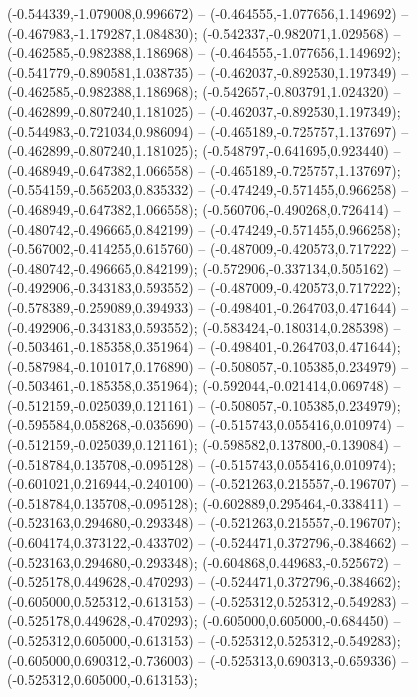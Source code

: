  (-0.544339,-1.079008,0.996672) -- (-0.464555,-1.077656,1.149692) -- (-0.467983,-1.179287,1.084830);
 (-0.542337,-0.982071,1.029568) -- (-0.462585,-0.982388,1.186968) -- (-0.464555,-1.077656,1.149692);
 (-0.541779,-0.890581,1.038735) -- (-0.462037,-0.892530,1.197349) -- (-0.462585,-0.982388,1.186968);
 (-0.542657,-0.803791,1.024320) -- (-0.462899,-0.807240,1.181025) -- (-0.462037,-0.892530,1.197349);
 (-0.544983,-0.721034,0.986094) -- (-0.465189,-0.725757,1.137697) -- (-0.462899,-0.807240,1.181025);
 (-0.548797,-0.641695,0.923440) -- (-0.468949,-0.647382,1.066558) -- (-0.465189,-0.725757,1.137697);
 (-0.554159,-0.565203,0.835332) -- (-0.474249,-0.571455,0.966258) -- (-0.468949,-0.647382,1.066558);
 (-0.560706,-0.490268,0.726414) -- (-0.480742,-0.496665,0.842199) -- (-0.474249,-0.571455,0.966258);
 (-0.567002,-0.414255,0.615760) -- (-0.487009,-0.420573,0.717222) -- (-0.480742,-0.496665,0.842199);
 (-0.572906,-0.337134,0.505162) -- (-0.492906,-0.343183,0.593552) -- (-0.487009,-0.420573,0.717222);
 (-0.578389,-0.259089,0.394933) -- (-0.498401,-0.264703,0.471644) -- (-0.492906,-0.343183,0.593552);
 (-0.583424,-0.180314,0.285398) -- (-0.503461,-0.185358,0.351964) -- (-0.498401,-0.264703,0.471644);
 (-0.587984,-0.101017,0.176890) -- (-0.508057,-0.105385,0.234979) -- (-0.503461,-0.185358,0.351964);
 (-0.592044,-0.021414,0.069748) -- (-0.512159,-0.025039,0.121161) -- (-0.508057,-0.105385,0.234979);
 (-0.595584,0.058268,-0.035690) -- (-0.515743,0.055416,0.010974) -- (-0.512159,-0.025039,0.121161);
 (-0.598582,0.137800,-0.139084) -- (-0.518784,0.135708,-0.095128) -- (-0.515743,0.055416,0.010974);
 (-0.601021,0.216944,-0.240100) -- (-0.521263,0.215557,-0.196707) -- (-0.518784,0.135708,-0.095128);
 (-0.602889,0.295464,-0.338411) -- (-0.523163,0.294680,-0.293348) -- (-0.521263,0.215557,-0.196707);
 (-0.604174,0.373122,-0.433702) -- (-0.524471,0.372796,-0.384662) -- (-0.523163,0.294680,-0.293348);
 (-0.604868,0.449683,-0.525672) -- (-0.525178,0.449628,-0.470293) -- (-0.524471,0.372796,-0.384662);
 (-0.605000,0.525312,-0.613153) -- (-0.525312,0.525312,-0.549283) -- (-0.525178,0.449628,-0.470293);
 (-0.605000,0.605000,-0.684450) -- (-0.525312,0.605000,-0.613153) -- (-0.525312,0.525312,-0.549283);
 (-0.605000,0.690312,-0.736003) -- (-0.525313,0.690313,-0.659336) -- (-0.525312,0.605000,-0.613153);
